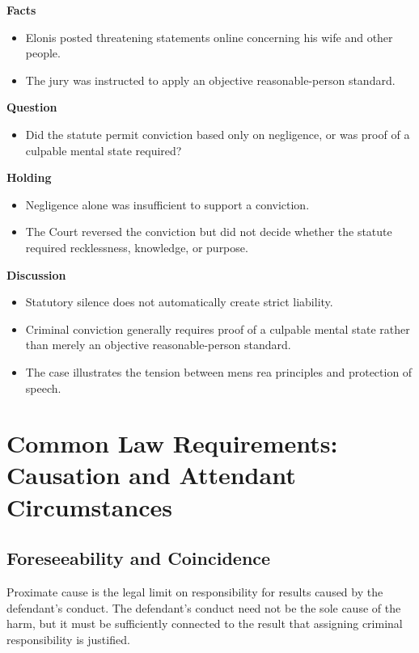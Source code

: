 \documentclass[11pt]{tex/lawoutline}
\begin{document}
{}
{
\textbf{Facts}
\begin{itemize}
    \item Elonis posted threatening statements online concerning his wife and other people.
    \item The jury was instructed to apply an objective reasonable-person standard.
\end{itemize}

\textbf{Question}
\begin{itemize}
    \item Did the statute permit conviction based only on negligence, or was proof of a culpable mental state required?
\end{itemize}

\textbf{Holding}
\begin{itemize}
    \item Negligence alone was insufficient to support a conviction.
    \item The Court reversed the conviction but did not decide whether the statute required recklessness, knowledge, or purpose.
\end{itemize}

\textbf{Discussion}
\begin{itemize}
    \item Statutory silence does not automatically create strict liability.
    \item Criminal conviction generally requires proof of a culpable mental state rather than merely an objective reasonable-person standard.
    \item The case illustrates the tension between mens rea principles and protection of speech.
\end{itemize}
}

\chapter{Common Law Requirements: Causation and Attendant Circumstances}

\section{Foreseeability and Coincidence}

{
Proximate cause is the legal limit on responsibility for results caused by the defendant's conduct. The defendant's conduct need not be the sole cause of the harm, but it must be sufficiently connected to the result that assigning criminal responsibility is justified.
}
\end{document}
